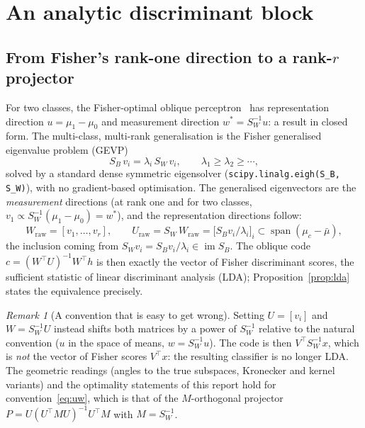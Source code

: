 \documentclass[11pt,a4paper]{article}
\theoremstyle{plain}
\theoremstyle{definition}
\theoremstyle{remark}
\newtheorem{remark}{Remark}
\newcommand{\im}{\operatorname{im}}
\newcommand{\spn}{\operatorname{span}}
\newcommand{\T}{\top}
\begin{document}
\section{An analytic discriminant block}
\label{sec:block}

\subsection{From Fisher's rank-one direction to a rank-\texorpdfstring{$r$}{r} projector}
For two classes, the Fisher-optimal oblique perceptron~\cite{fisher1936} has
representation direction $u=\mu_1-\mu_0$ and measurement direction $w^\ast=S_W^{-1}u$: a
result in closed form. The multi-class, multi-rank generalisation is the Fisher
generalised eigenvalue problem (GEVP)
\begin{equation}
  S_B\,v_i=\lambda_i\,S_W\,v_i,\qquad \lambda_1\ge\lambda_2\ge\cdots,
  \label{eq:gevp}
\end{equation}
solved by a standard dense symmetric eigensolver
(\texttt{scipy.linalg.eigh(S\_B, S\_W)}), with no gradient-based
optimisation. The generalised eigenvectors are the
\emph{measurement} directions (at rank one and for two classes,
$v_1\propto S_W^{-1}(\mu_1-\mu_0)=w^\ast$), and the representation directions
follow:
\begin{equation}
  W_{\mathrm{raw}}=[v_1,\dots,v_r],\qquad
  U_{\mathrm{raw}}=S_W\,W_{\mathrm{raw}}=\bigl[S_Bv_i/\lambda_i\bigr]_i\subset\spn(\mu_c-\bar\mu),
  \label{eq:uw}
\end{equation}
the inclusion coming from $S_Wv_i=S_Bv_i/\lambda_i\in\im S_B$. The oblique
code $c=(W^\T U)^{-1}W^\T h$ is then exactly the vector of Fisher
discriminant scores, the sufficient statistic of linear discriminant analysis
(LDA); Proposition~\ref{prop:lda} states the equivalence precisely.

\begin{remark}[A convention that is easy to get wrong]
Setting $U=[v_i]$ and $W=S_W^{-1}U$ instead shifts both matrices by a power of
$S_W^{-1}$ relative to the natural convention ($u$ in the space of means,
$w=S_W^{-1}u$). The code is then $V^\T S_W^{-1}x$, which is \emph{not} the
vector of Fisher scores $V^\T x$: the resulting classifier is no longer LDA.
The geometric readings (angles to the true subspaces, Kronecker and kernel
variants) and the optimality statements of this report hold for
convention~\eqref{eq:uw}, which is that of the $M$-orthogonal projector
$P=U(U^\T MU)^{-1}U^\T M$ with $M=S_W^{-1}$.
\end{remark}
\end{document}
